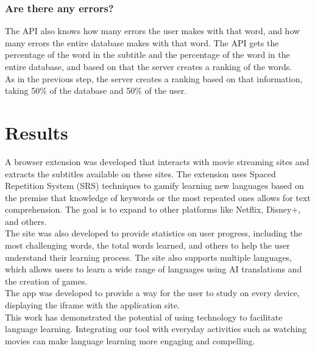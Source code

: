\documentclass[12pt]{article}
\begin{document}
\subsubsection{Are there any errors?}
The API also knows how many errors the user makes with that word, and how many errors the entire database makes with that word. The API gets the percentage of the word in the subtitle and the percentage of the word in the entire database, and based on that the server creates a ranking of the words. \\
As in the previous step, the server creates a ranking based on that information, taking 50\% of the database and 50\% of the user. \\




\section{Results}
A browser extension was developed that interacts with movie streaming sites and extracts the subtitles available on these sites. The extension uses Spaced Repetition System (SRS) techniques to gamify learning new languages based on the premise that knowledge of keywords or the most repeated ones allows for text comprehension. The goal is to expand to other platforms like Netflix, Disney+, and others. \\ 
The site was also developed to provide statistics on user progress, including the most challenging words, the total words learned, and others to help the user understand their learning process. The site also supports multiple languages, which allows users to learn a wide range of languages using AI translations and the creation of games.  \\
The app was developed to provide a way for the user to study on every device, displaying the iframe with the application site.\\
This work has demonstrated the potential of using technology to facilitate language learning. Integrating our tool with everyday activities such as watching movies can make language learning more engaging and compelling. 
\end{document}
